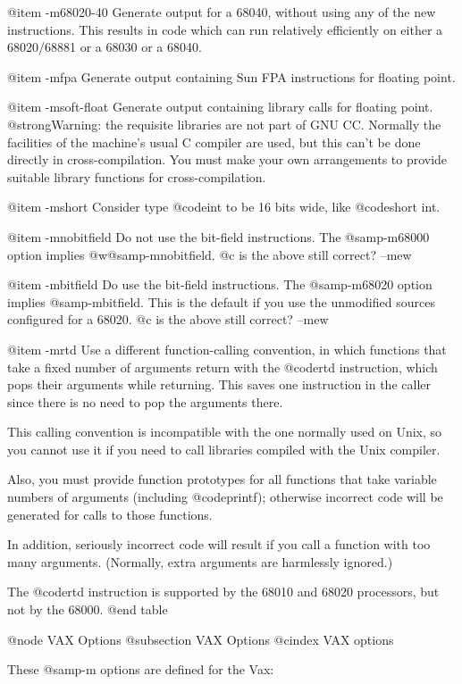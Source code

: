{{@item -m68020-40
Generate output for a 68040, without using any of the new instructions.
This results in code which can run relatively efficiently on either a
68020/68881 or a 68030 or a 68040.

@item -mfpa
Generate output containing Sun FPA instructions for floating point.

@item -msoft-float
Generate output containing library calls for floating point.
@strong{Warning:} the requisite libraries are not part of GNU CC.
Normally the facilities of the machine's usual C compiler are used, but
this can't be done directly in cross-compilation.  You must make your
own arrangements to provide suitable library functions for
cross-compilation.

@item -mshort
Consider type @code{int} to be 16 bits wide, like @code{short int}.

@item -mnobitfield
Do not use the bit-field instructions.  The @samp{-m68000} option
implies @w{@samp{-mnobitfield}}.
@c is the above still correct?  --mew

@item -mbitfield
Do use the bit-field instructions.  The @samp{-m68020} option implies
@samp{-mbitfield}.  This is the default if you use the unmodified
sources configured for a 68020.
@c is the above still correct?  --mew

@item -mrtd
Use a different function-calling convention, in which functions
that take a fixed number of arguments return with the @code{rtd}
instruction, which pops their arguments while returning.  This
saves one instruction in the caller since there is no need to pop
the arguments there.

This calling convention is incompatible with the one normally
used on Unix, so you cannot use it if you need to call libraries
compiled with the Unix compiler.

Also, you must provide function prototypes for all functions that
take variable numbers of arguments (including @code{printf});
otherwise incorrect code will be generated for calls to those
functions.

In addition, seriously incorrect code will result if you call a
function with too many arguments.  (Normally, extra arguments are
harmlessly ignored.)

The @code{rtd} instruction is supported by the 68010 and 68020
processors, but not by the 68000.
@end table

@node VAX Options
@subsection VAX Options
@cindex VAX options

These @samp{-m} options are defined for the Vax:

}}

